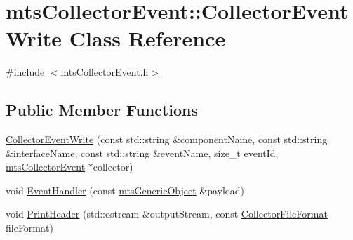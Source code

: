 \hypertarget{classmts_collector_event_1_1_collector_event_write}{}\section{mts\+Collector\+Event\+:\+:Collector\+Event\+Write Class Reference}
\label{classmts_collector_event_1_1_collector_event_write}


{\ttfamily \#include $<$mts\+Collector\+Event.\+h$>$}

\subsection*{Public Member Functions}
\begin{DoxyCompactItemize}
\item 
\hyperlink{classmts_collector_event_1_1_collector_event_write_abe8f342fbb5e55e9a34fc54859e8fc15}{Collector\+Event\+Write} (const std\+::string \&component\+Name, const std\+::string \&interface\+Name, const std\+::string \&event\+Name, size\+\_\+t event\+Id, \hyperlink{classmts_collector_event}{mts\+Collector\+Event} $\ast$collector)
\item 
void \hyperlink{classmts_collector_event_1_1_collector_event_write_ae7e09b465fae4bc519b01505c2898c6c}{Event\+Handler} (const \hyperlink{classmts_generic_object}{mts\+Generic\+Object} \&payload)
\item 
void \hyperlink{classmts_collector_event_1_1_collector_event_write_ad9d9698159b9105a5580cc2f92e1f749}{Print\+Header} (std\+::ostream \&output\+Stream, const \hyperlink{group__cisst_multi_task_gaa228bed8144053d0bfa316f9ac9d0901}{Collector\+File\+Format} file\+Format)
\end{DoxyCompactItemize}
